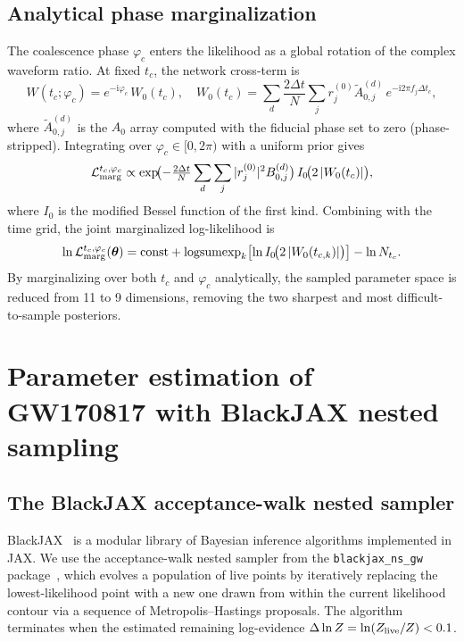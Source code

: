 \documentclass[twocolumn,superscriptaddress,nofootinbib,aps,prd]{revtex4-2}
\begin{document}
\subsection{Analytical phase marginalization}
\label{sec:phase_marg}

The coalescence phase $\varphi_c$ enters the likelihood as a global rotation
of the complex waveform ratio.  At fixed $t_c$, the network cross-term is
\begin{equation}
    W(t_c; \varphi_c) = e^{-\mathrm{i}\varphi_c}\,W_0(t_c),
    \quad W_0(t_c) = \sum_d \frac{2\Delta t}{N}
    \sum_j r_j^{(0)} \tilde{A}_{0,j}^{(d)}\,
    e^{-\mathrm{i}2\pi f_j \Delta t_c},
\end{equation}
where $\tilde{A}_{0,j}^{(d)}$ is the $A_0$ array computed with the
fiducial phase set to zero (phase-stripped).  Integrating over $\varphi_c \in [0, 2\pi)$
with a uniform prior gives
\begin{equation}
    \mathcal{L}_{\rm marg}^{t_c,\varphi_c}
    \propto \exp\!\bigl(-\tfrac{2\Delta t}{N} \sum_d\sum_j |r_j^{(0)}|^2 B_{0,j}^{(d)}\bigr)\,
    I_0\!\bigl(2\,|W_0(t_c)|\bigr),
\end{equation}
where $I_0$ is the modified Bessel function of the first kind.  Combining
with the time grid, the joint marginalized log-likelihood is
\begin{equation}
    \ln \mathcal{L}_{\rm marg}^{t_c,\varphi_c}(\bm{\theta})
    = \mathrm{const} + \mathrm{logsumexp}_k
      \bigl[\ln I_0\!\bigl(2\,|W_0(t_{c,k})|\bigr)\bigr]
      - \ln N_{t_c}.
    \label{eq:tc_phi_marg}
\end{equation}
By marginalizing over both $t_c$ and $\varphi_c$ analytically, the sampled
parameter space is reduced from 11 to 9 dimensions, removing the two
sharpest and most difficult-to-sample posteriors.


\section{Parameter estimation of GW170817 with BlackJAX nested sampling}
\label{sec:pe}

\subsection{The BlackJAX acceptance-walk nested sampler}

BlackJAX~\cite{BlackJAX} is a modular library of Bayesian inference
algorithms implemented in JAX.  We use the acceptance-walk nested sampler
from the \texttt{blackjax\_ns\_gw} package~\cite{Handley:2015fda}, which
evolves a population of live points by iteratively replacing the
lowest-likelihood point with a new one drawn from within the current
likelihood contour via a sequence of Metropolis--Hastings proposals.  The
algorithm terminates when the estimated remaining log-evidence
$\Delta \ln Z = \ln(Z_{\rm live}/Z) < 0.1$.
\end{document}
